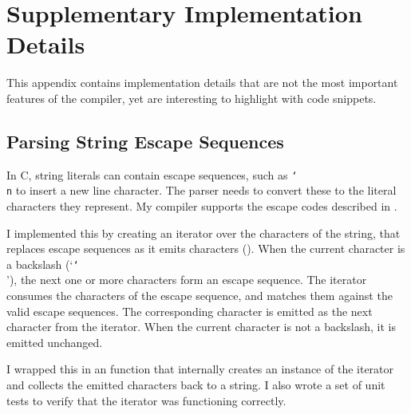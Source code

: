 \documentclass[../00-main.tex]{subfiles}
\begin{document}
\chapter{Supplementary Implementation Details}

This appendix contains implementation details that are not the most important features of the compiler, yet are interesting to highlight with code snippets.

\section{Parsing String Escape Sequences}\label{app:sec:parsing string escape sequences}

In C, string literals can contain escape sequences, such as \texttt{\char`\\n} to insert a new line character.
The parser needs to convert these to the literal characters they represent.
My compiler supports the escape codes described in .

I implemented this by creating an iterator over the characters of the string, that replaces escape sequences as it emits characters ().
When the current character is a backslash (`\texttt{\char`\\}'), the next one or more characters form an escape sequence.
The iterator consumes the characters of the escape sequence, and matches them against the valid escape sequences.
The corresponding character is emitted as the next character from the iterator.
When the current character is not a backslash, it is emitted unchanged.

I wrapped this in an  function that internally creates an instance of the iterator and collects the emitted characters back to a string.
I also wrote a set of unit tests to verify that the iterator was functioning correctly.
\end{document}
